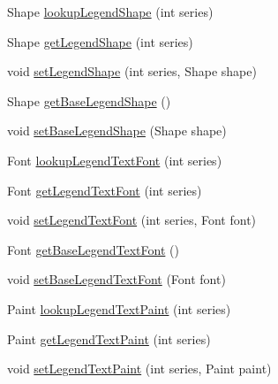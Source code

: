 \begin{DoxyCompactItemize}
\item 
Shape \mbox{\hyperlink{classorg_1_1jfree_1_1chart_1_1renderer_1_1_abstract_renderer_a2de16cff7b8eb8ea2612037b0b7321a0}{lookup\+Legend\+Shape}} (int series)
\item 
Shape \mbox{\hyperlink{classorg_1_1jfree_1_1chart_1_1renderer_1_1_abstract_renderer_a89b83430ef7148f8e08c2e03bd3a65d9}{get\+Legend\+Shape}} (int series)
\item 
void \mbox{\hyperlink{classorg_1_1jfree_1_1chart_1_1renderer_1_1_abstract_renderer_a2482ff12a9196057ae7bb7e3e83217d3}{set\+Legend\+Shape}} (int series, Shape shape)
\item 
Shape \mbox{\hyperlink{classorg_1_1jfree_1_1chart_1_1renderer_1_1_abstract_renderer_aa45bf25afaedd7148a78f4e4d29cf572}{get\+Base\+Legend\+Shape}} ()
\item 
void \mbox{\hyperlink{classorg_1_1jfree_1_1chart_1_1renderer_1_1_abstract_renderer_ab132444b05bc1462d068bbfbdc6f4e9e}{set\+Base\+Legend\+Shape}} (Shape shape)
\item 
Font \mbox{\hyperlink{classorg_1_1jfree_1_1chart_1_1renderer_1_1_abstract_renderer_a8c66e75fd350dabc054247edc4323492}{lookup\+Legend\+Text\+Font}} (int series)
\item 
Font \mbox{\hyperlink{classorg_1_1jfree_1_1chart_1_1renderer_1_1_abstract_renderer_a12e9a9c5c10725536c9a620265f3fea5}{get\+Legend\+Text\+Font}} (int series)
\item 
void \mbox{\hyperlink{classorg_1_1jfree_1_1chart_1_1renderer_1_1_abstract_renderer_ab991a17b7b53153f0e044b7a6fbc00ac}{set\+Legend\+Text\+Font}} (int series, Font font)
\item 
Font \mbox{\hyperlink{classorg_1_1jfree_1_1chart_1_1renderer_1_1_abstract_renderer_a9cfa265593b1d02ecda6499a44b172a4}{get\+Base\+Legend\+Text\+Font}} ()
\item 
void \mbox{\hyperlink{classorg_1_1jfree_1_1chart_1_1renderer_1_1_abstract_renderer_ae4d2f12e3988663d2a9dbd3f13deb21a}{set\+Base\+Legend\+Text\+Font}} (Font font)
\item 
Paint \mbox{\hyperlink{classorg_1_1jfree_1_1chart_1_1renderer_1_1_abstract_renderer_a53b35f826cab840cdbaee9169388f305}{lookup\+Legend\+Text\+Paint}} (int series)
\item 
Paint \mbox{\hyperlink{classorg_1_1jfree_1_1chart_1_1renderer_1_1_abstract_renderer_a7249535cd3bccc3a15d81e80aae52de5}{get\+Legend\+Text\+Paint}} (int series)
\item 
void \mbox{\hyperlink{classorg_1_1jfree_1_1chart_1_1renderer_1_1_abstract_renderer_a78ea34d0e7c713aa876d24686a80edb0}{set\+Legend\+Text\+Paint}} (int series, Paint paint)

\end{DoxyCompactItemize}
